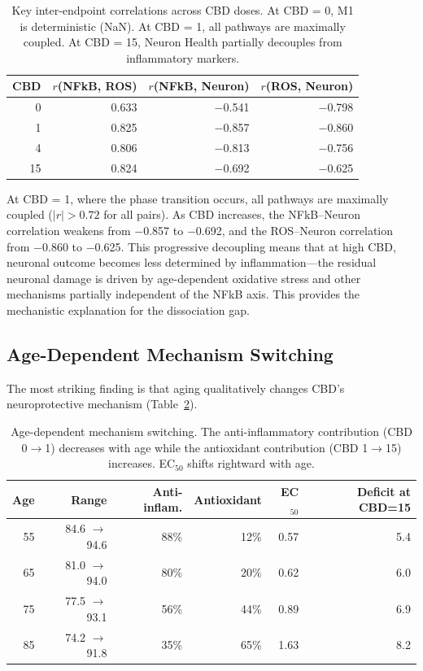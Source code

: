 \documentclass[10pt,letterpaper]{article}
\begin{document}
\begin{table}[htbp]
\centering
\caption{Key inter-endpoint correlations across CBD doses. At CBD = 0, M1 is deterministic (NaN). At CBD = 1, all pathways are maximally coupled. At CBD = 15, Neuron Health partially decouples from inflammatory markers.}
\label{tab:coupling}
\begin{tabular}{rrrr}
\toprule
CBD & $r$(NFkB, ROS) & $r$(NFkB, Neuron) & $r$(ROS, Neuron) \\
\midrule
0  & 0.633  & $-$0.541 & $-$0.798 \\
1  & 0.825  & $-$0.857 & $-$0.860 \\
4  & 0.806  & $-$0.813 & $-$0.756 \\
15 & 0.824  & $-$0.692 & $-$0.625 \\
\bottomrule
\end{tabular}
\end{table}

At CBD = 1, where the phase transition occurs, all pathways are maximally coupled ($|r| > 0.72$ for all pairs). As CBD increases, the NFkB--Neuron correlation weakens from $-$0.857 to $-$0.692, and the ROS--Neuron correlation from $-$0.860 to $-$0.625. This progressive decoupling means that at high CBD, neuronal outcome becomes less determined by inflammation---the residual neuronal damage is driven by age-dependent oxidative stress and other mechanisms partially independent of the NFkB axis. This provides the mechanistic explanation for the dissociation gap.

\subsection{Age-Dependent Mechanism Switching}

The most striking finding is that aging qualitatively changes CBD's neuroprotective mechanism (Table~\ref{tab:age_mechanism}).

\begin{table}[htbp]
\centering
\caption{Age-dependent mechanism switching. The anti-inflammatory contribution (CBD 0$\to$1) decreases with age while the antioxidant contribution (CBD 1$\to$15) increases. EC$_{50}$ shifts rightward with age.}
\label{tab:age_mechanism}
\begin{tabular}{rrrrrr}
\toprule
Age & Range & Anti-inflam. & Antioxidant & EC$_{50}$ & Deficit at CBD=15 \\
\midrule
55 & 84.6 $\to$ 94.6 & 88\% & 12\% & 0.57 & 5.4 \\
65 & 81.0 $\to$ 94.0 & 80\% & 20\% & 0.62 & 6.0 \\
75 & 77.5 $\to$ 93.1 & 56\% & 44\% & 0.89 & 6.9 \\
85 & 74.2 $\to$ 91.8 & 35\% & 65\% & 1.63 & 8.2 \\
\bottomrule
\end{tabular}
\end{table}
\end{document}
